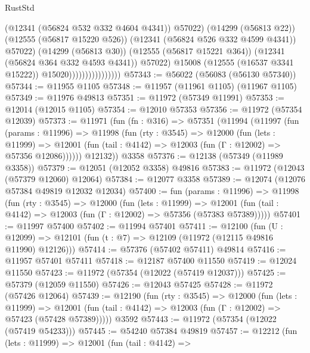 \begin{lexlean}{RustStd}
\begin{coremodule}
                                          (@12341 (@56824 @532 @332 @4604 @4341))
                                          @57022)
                                        (@14299 (@56813 @22))
                                        (@12555 (@56817 @15220 @526))
                                        (@12341 (@56824 @526 @332 @4599 @4341))
                                        @57022)
                                      (@14299 (@56813 @30))
                                      (@12555 (@56817 @15221 @364))
                                      (@12341 (@56824 @364 @332 @4593 @4341))
                                      @57022)
                                    @15008
                                    (@12555 (@16537 @3341 @15222))
                                    @15020))))))))))))))))
@57343 := @56022 (@56083 (@56130 @57340))
@57344 := @11955 @1105
@57348 := @11957 (@11961 @1105) (@11967 @1105)
@57349 := @11976 @49813
@57351 := @11972 (@57349 @11991)
@57353 := @12014 (@12015 @1105)
@57354 := @12010 @57353
@57356 := @11972 (@57354 @12039)
@57373 := @11971
    (fun (fn : @316) =>
    @57351
      (@11994
        (@11997
          (fun (params : @11996) =>
          @11998
            (fun (rty : @3545) =>
            @12000
              (fun (lets : @11999) =>
              @12001 (fun (tail : @4142) => @12003 (fun (Γ : @12002) => @57356 @12086))))))
        @12132))
    @3358
@57376 := @12138 (@57349 (@11989 @3358))
@57379 := @12051 (@12052 @3358) @49816
@57383 := @11972 (@12043 (@57379 @12060) @12064)
@57384 := @12077 @3358
@57389 := @12074 (@12076 @57384 @49819 @12032 @12034)
@57400 := fun (params : @11996) =>
  @11998
    (fun (rty : @3545) =>
    @12000
      (fun (lets : @11999) =>
      @12001 (fun (tail : @4142) => @12003 (fun (Γ : @12002) => @57356 (@57383 @57389)))))
@57401 := @11997 @57400
@57402 := @11994 @57401
@57411 := @12100
    (fun (U : @12099) => @12101 (fun (t : @7) => @12109 (@11972 (@12115 @49816 @11990) @12126)))
@57414 := @57376 (@57402 @57411) @49814
@57416 := @11957 @57401 @57411
@57418 := @12187 @57400 @11550
@57419 := @12024 @11550
@57423 := @11972 (@57354 (@12022 (@57419 @12037)))
@57425 := @57379 (@12059 @11550)
@57426 := @12043 @57425
@57428 := @11972 (@57426 @12064)
@57439 := @12190
    (fun (rty : @3545) =>
    @12000
      (fun (lets : @11999) =>
      @12001 (fun (tail : @4142) => @12003 (fun (Γ : @12002) => @57423 (@57428 @57389)))))
    @3592
@57443 := @11972 (@57354 (@12022 (@57419 @54233)))
@57445 := @54240 @57384 @49819
@57457 := @12212
    (fun (lets : @11999) =>
    @12001
      (fun (tail : @4142) =>

\end{coremodule}
\end{lexlean}
